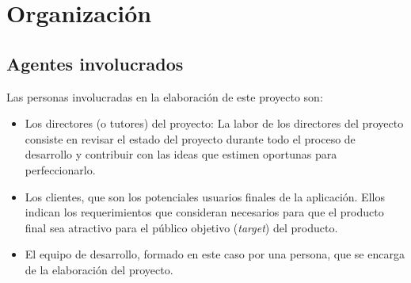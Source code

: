 
\section{Organización}

\subsection{Agentes involucrados}

Las personas involucradas en la elaboración de este proyecto son:
\begin{itemize}

    \item Los directores (o tutores) del proyecto: La labor de los directores del proyecto consiste
    en revisar el estado del proyecto durante todo el proceso de desarrollo y contribuir con las ideas 
    que estimen oportunas para perfeccionarlo. 

    \item Los clientes, que son los potenciales usuarios finales de la aplicación. Ellos indican los 
    requerimientos que consideran necesarios para que el producto final sea atractivo para el público 
    objetivo (\textit{target}) del producto.
    
    \item El equipo de desarrollo, formado en este caso por una persona, que se encarga de la 
    elaboración del proyecto.   

\end{itemize}

